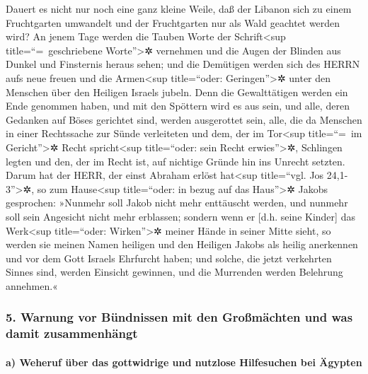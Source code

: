 Dauert es nicht nur noch eine ganz kleine Weile, daß der
Libanon sich zu einem Fruchtgarten umwandelt und der Fruchtgarten nur
als Wald geachtet werden wird? An jenem Tage werden die
Tauben Worte der Schrift\textless sup title=``=~geschriebene
Worte''\textgreater✲ vernehmen und die Augen der Blinden aus Dunkel und
Finsternis heraus sehen; und die Demütigen werden sich
des HERRN aufs neue freuen und die Armen\textless sup title=``oder:
Geringen''\textgreater✲ unter den Menschen über den Heiligen Israels
jubeln. Denn die Gewalttätigen werden ein Ende genommen
haben, und mit den Spöttern wird es aus sein, und alle, deren Gedanken
auf Böses gerichtet sind, werden ausgerottet sein, alle,
die da Menschen in einer Rechtssache zur Sünde verleiteten und dem, der
im Tor\textless sup title=``=~im Gericht''\textgreater✲ Recht
spricht\textless sup title=``oder: sein Recht erwies''\textgreater✲,
Schlingen legten und den, der im Recht ist, auf nichtige Gründe hin ins
Unrecht setzten. Darum hat der HERR, der einst Abraham
erlöst hat\textless sup title=``vgl. Jos 24,1-3''\textgreater✲, so zum
Hause\textless sup title=``oder: in bezug auf das Haus''\textgreater✲
Jakobs gesprochen: »Nunmehr soll Jakob nicht mehr enttäuscht werden, und
nunmehr soll sein Angesicht nicht mehr erblassen; sondern
wenn er {[}d.h. seine Kinder{]} das Werk\textless sup title=``oder:
Wirken''\textgreater✲ meiner Hände in seiner Mitte sieht, so werden sie
meinen Namen heiligen und den Heiligen Jakobs als heilig anerkennen und
vor dem Gott Israels Ehrfurcht haben; und solche, die
jetzt verkehrten Sinnes sind, werden Einsicht gewinnen, und die
Murrenden werden Belehrung annehmen.«

\hypertarget{warnung-vor-buxfcndnissen-mit-den-grouxdfmuxe4chten-und-was-damit-zusammenhuxe4ngt}{%
\subsubsection{5. Warnung vor Bündnissen mit den Großmächten und was
damit
zusammenhängt}\label{warnung-vor-buxfcndnissen-mit-den-grouxdfmuxe4chten-und-was-damit-zusammenhuxe4ngt}}

\hypertarget{a-weheruf-uxfcber-das-gottwidrige-und-nutzlose-hilfesuchen-bei-uxe4gypten}{%
\paragraph{a) Weheruf über das gottwidrige und nutzlose Hilfesuchen bei
Ägypten}\label{a-weheruf-uxfcber-das-gottwidrige-und-nutzlose-hilfesuchen-bei-uxe4gypten}}

